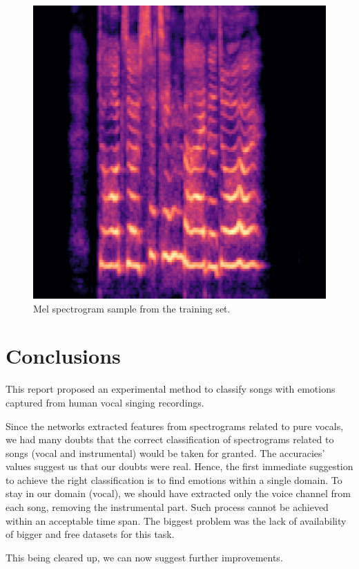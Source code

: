 \documentclass[10pt,twocolumn,letterpaper]{article}
\begin{document}
      \begin{figure}[h]
         \begin{center}
         \includegraphics[width=0.8\linewidth]{img/mel-spectrogram.png}
         \end{center}
            \caption{Mel spectrogram sample from the training set.}
         \label{fig:mel-sample}
         \end{figure}

\section{Conclusions}\label{conclusions}

This report proposed an experimental method to classify songs with emotions captured from human vocal singing recordings.

Since the networks extracted features from spectrograms related to pure vocals, we had many doubts that the correct classification of spectrograms related to songs (vocal and instrumental) would be taken for granted. The accuracies' values suggest us that our doubts were real. Hence, the first immediate suggestion to achieve the right classification is to find emotions within a single domain. To stay in our domain (vocal), we should have extracted only the voice channel from each song, removing the instrumental part. Such process cannot be achieved within an acceptable time span. The biggest problem was the lack of availability of bigger and free datasets for this task.

This being cleared up, we can now suggest further improvements.
\end{document}
